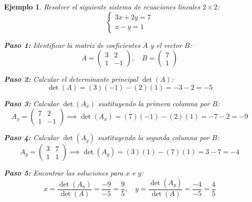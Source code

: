 \documentclass[12pt, a4paper]{article}
\newtheorem{ej}{Ejemplo}
\begin{document}
	\begin{ej}
		Resolver el siguiente sistema de ecuaciones lineales $2 \times 2$:
		\[
		\begin{cases}
			3x + 2y = 7 \\
			x - y = 1
		\end{cases}
		\]
		
		\textbf{Paso 1:} Identificar la matriz de coeficientes $A$ y el vector $B$:
		\[
		A = \begin{pmatrix} 3 & 2 \\ 1 & -1 \end{pmatrix}, \quad B = \begin{pmatrix} 7 \\ 1 \end{pmatrix}
		\]
		
		\textbf{Paso 2:} Calcular el determinante principal $\det(A)$:
		\[
		\det(A) = (3)(-1) - (2)(1) = -3 - 2 = -5
		\]
		
		\textbf{Paso 3:} Calcular $\det(A_x)$ sustituyendo la primera columna por $B$:
		\[
		A_x = \begin{pmatrix} 7 & 2 \\ 1 & -1 \end{pmatrix} \implies \det(A_x) = (7)(-1) - (2)(1) = -7 - 2 = -9
		\]
		
		\textbf{Paso 4:} Calcular $\det(A_y)$ sustituyendo la segunda columna por $B$:
		\[
		A_y = \begin{pmatrix} 3 & 7 \\ 1 & 1 \end{pmatrix} \implies \det(A_y) = (3)(1) - (7)(1) = 3 - 7 = -4
		\]
		
		\textbf{Paso 5:} Encontrar las soluciones para $x$ e $y$:
		\[
		x = \frac{\det(A_x)}{\det(A)} = \frac{-9}{-5} = \frac{9}{5}, \quad y = \frac{\det(A_y)}{\det(A)} = \frac{-4}{-5} = \frac{4}{5}
		\]
		\end{ej}
			
		
\end{document}
